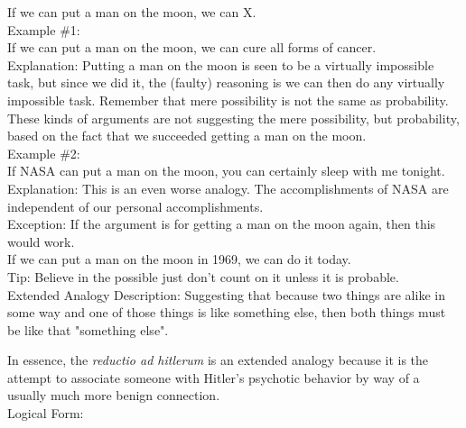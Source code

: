 \documentclass[a4paper,12pt,single,pdftex]{scrartcl}
\begin{document}
    
      If we can put a man on the moon, we can X.
    \\

    
      Example \#1:
    \\

    
      If we can put a man on the moon, we can cure all forms of cancer.
    \\

    
      Explanation: Putting a man on the moon is seen to be a virtually impossible task, but since we did it, the (faulty) reasoning is we can then do any virtually impossible task.  Remember that mere possibility is not the same as probability.  These kinds of arguments are not suggesting the mere possibility, but probability, based on the fact that we succeeded getting a man on the moon.
    \\

    
      Example \#2:
    \\

    
      If NASA can put a man on the moon, you can certainly sleep with me tonight.
    \\

    
      Explanation: This is an even worse analogy. The accomplishments of NASA are independent of our personal accomplishments.
    \\

    
      Exception: If the argument is for getting a man on the moon again, then this would work.
    \\

    
      If we can put a man on the moon in 1969, we can do it today.
    \\

    
      Tip: Believe in the possible just don’t count on it unless it is probable.
    \\

  

Extended Analogy
    Description: Suggesting that because two things are alike in some way and one of those things is like something else, then both things must be like that "something else".

    
      In essence, the {\it reductio ad hitlerum} is an extended analogy because it is the attempt to associate someone with Hitler’s psychotic behavior by way of a usually much more benign connection.
    \\

    
      Logical Form:
    \\
\end{document}
